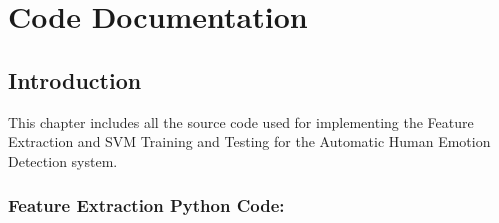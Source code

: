 ﻿\chapter{Code Documentation} %
%


\section{Introduction} %
This chapter includes all the source code used for implementing the Feature Extraction and SVM Training and Testing for the Automatic Human Emotion Detection system.
\subsection*{Feature Extraction Python Code:}


